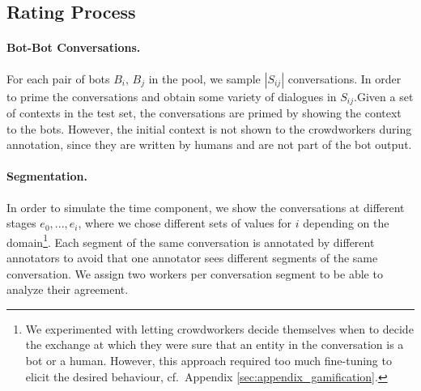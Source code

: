 \documentclass[11pt,a4paper]{article}
\begin{document}
\subsection{Rating Process}\label{sec:setting}

\paragraph{Bot-Bot Conversations.} For each pair of bots $B_i$, $B_j$ in the pool, we sample $|S_{ij}|$ conversations. In order to prime the conversations and obtain some variety of dialogues in $S_{ij}$.Given a set of contexts in the test set, the conversations are primed by showing the context to the bots. However, the initial context is not shown to the crowdworkers during annotation, since they are written by humans and are not part of the bot output. %
\paragraph{Segmentation.} In order to simulate the time component, we show the conversations at different stages $e_0, ..., e_i$, where we chose different sets of values for $i$ depending on the domain\footnote{We experimented with letting crowdworkers decide themselves when to decide the exchange at which they were sure that an entity in the conversation is a bot or a human. However, this approach required too much fine-tuning to elicit the desired behaviour, cf.\ Appendix \ref{sec:appendix_gamification}.}. Each segment of the same conversation is annotated by different annotators to avoid that one annotator sees different segments of the same conversation. We assign two workers per conversation segment to be able to analyze their agreement.
\end{document}
